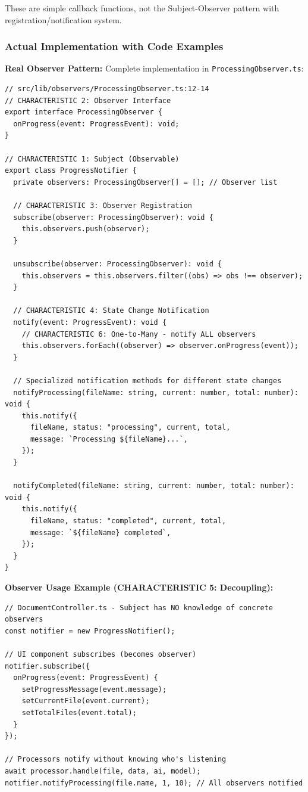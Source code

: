 \documentclass[11pt]{article}
\begin{document}
These are simple callback functions, not the Subject-Observer pattern with registration/notification system.

\subsubsection{Actual Implementation with Code Examples}

\textbf{Real Observer Pattern:} Complete implementation in \texttt{ProcessingObserver.ts}:

\begin{verbatim}
// src/lib/observers/ProcessingObserver.ts:12-14
// CHARACTERISTIC 2: Observer Interface
export interface ProcessingObserver {
  onProgress(event: ProgressEvent): void;
}

// CHARACTERISTIC 1: Subject (Observable)
export class ProgressNotifier {
  private observers: ProcessingObserver[] = []; // Observer list

  // CHARACTERISTIC 3: Observer Registration
  subscribe(observer: ProcessingObserver): void {
    this.observers.push(observer);
  }

  unsubscribe(observer: ProcessingObserver): void {
    this.observers = this.observers.filter((obs) => obs !== observer);
  }

  // CHARACTERISTIC 4: State Change Notification
  notify(event: ProgressEvent): void {
    // CHARACTERISTIC 6: One-to-Many - notify ALL observers
    this.observers.forEach((observer) => observer.onProgress(event));
  }

  // Specialized notification methods for different state changes
  notifyProcessing(fileName: string, current: number, total: number): void {
    this.notify({
      fileName, status: "processing", current, total,
      message: `Processing ${fileName}...`,
    });
  }

  notifyCompleted(fileName: string, current: number, total: number): void {
    this.notify({
      fileName, status: "completed", current, total,
      message: `${fileName} completed`,
    });
  }
}
\end{verbatim}

\textbf{Observer Usage Example (CHARACTERISTIC 5: Decoupling):}
\begin{verbatim}
// DocumentController.ts - Subject has NO knowledge of concrete observers
const notifier = new ProgressNotifier();

// UI component subscribes (becomes observer)
notifier.subscribe({
  onProgress(event: ProgressEvent) {
    setProgressMessage(event.message);
    setCurrentFile(event.current);
    setTotalFiles(event.total);
  }
});

// Processors notify without knowing who's listening
await processor.handle(file, data, ai, model);
notifier.notifyProcessing(file.name, 1, 10); // All observers notified
\end{verbatim}
\end{document}
